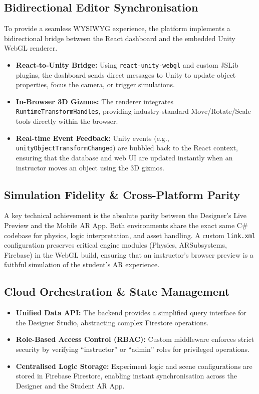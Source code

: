 \documentclass[12pt,a4paper]{article}
\begin{document}
\subsection{Bidirectional Editor Synchronisation}

To provide a seamless WYSIWYG experience, the platform implements a bidirectional bridge
between the React dashboard and the embedded Unity WebGL renderer.

\begin{itemize}[leftmargin=1.4cm]
  \item \textbf{React-to-Unity Bridge:} Using \texttt{react-unity-webgl} and custom
        JSLib plugins, the dashboard sends direct messages to Unity to update object
        properties, focus the camera, or trigger simulations.
  \item \textbf{In-Browser 3D Gizmos:} The renderer integrates
        \texttt{RuntimeTransformHandles}, providing industry-standard Move/Rotate/Scale
        tools directly within the browser.
  \item \textbf{Real-time Event Feedback:} Unity events (e.g.,
        \texttt{unityObjectTransformChanged}) are bubbled back to the React context,
        ensuring that the database and web UI are updated instantly when an instructor
        moves an object using the 3D gizmos.
\end{itemize}

\subsection{Simulation Fidelity \& Cross-Platform Parity}

A key technical achievement is the absolute parity between the Designer's Live Preview
and the Mobile AR App. Both environments share the exact same C\# codebase for physics,
logic interpretation, and asset handling. A custom \texttt{link.xml} configuration
preserves critical engine modules (Physics, ARSubsystems, Firebase) in the WebGL build,
ensuring that an instructor's browser preview is a faithful simulation of the student's
AR experience.

\subsection{Cloud Orchestration \& State Management}

\begin{itemize}[leftmargin=1.4cm]
  \item \textbf{Unified Data API:} The backend provides a simplified query interface for
        the Designer Studio, abstracting complex Firestore operations.
  \item \textbf{Role-Based Access Control (RBAC):} Custom middleware enforces strict
        security by verifying ``instructor'' or ``admin'' roles for privileged operations.
  \item \textbf{Centralised Logic Storage:} Experiment logic and scene configurations
        are stored in Firebase Firestore, enabling instant synchronisation across the
        Designer and the Student AR App.
\end{itemize}
\end{document}
